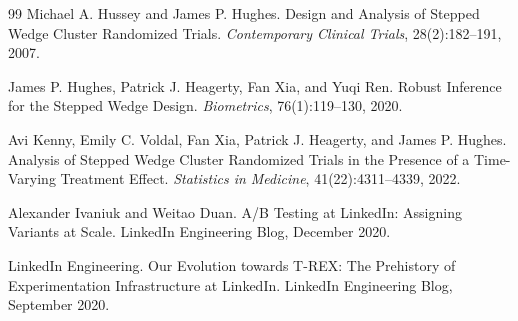 \documentclass{article}
\begin{document}
\begin{thebibliography}{99}
   Michael A. Hussey and James P. Hughes. Design and Analysis of Stepped Wedge Cluster Randomized Trials. \textit{Contemporary Clinical Trials}, 28(2):182--191, 2007.

   James P. Hughes, Patrick J. Heagerty, Fan Xia, and Yuqi Ren. Robust Inference for the Stepped Wedge Design. \textit{Biometrics}, 76(1):119--130, 2020.

   Avi Kenny, Emily C. Voldal, Fan Xia, Patrick J. Heagerty, and James P. Hughes. Analysis of Stepped Wedge Cluster Randomized Trials in the Presence of a Time-Varying Treatment Effect. \textit{Statistics in Medicine}, 41(22):4311--4339, 2022.

   Alexander Ivaniuk and Weitao Duan. A/B Testing at LinkedIn: Assigning Variants at Scale. LinkedIn Engineering Blog, December 2020.

   LinkedIn Engineering. Our Evolution towards T-REX: The Prehistory of Experimentation Infrastructure at LinkedIn. LinkedIn Engineering Blog, September 2020.

\end{thebibliography}
\end{document}
